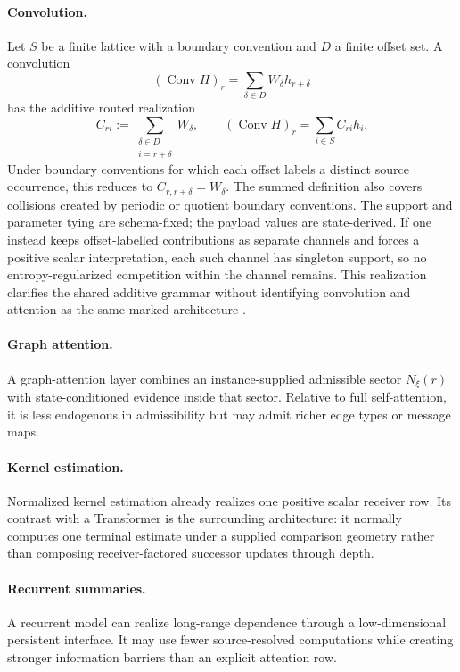 \paragraph{Convolution.}
Let $S$ be a finite lattice with a boundary convention and $D$ a finite offset set. A convolution
\[
(\operatorname{Conv}H)_r=\sum_{\delta\in D}W_\delta h_{r+\delta}
\]
has the additive routed realization
\[
C_{ri}
:=
\sum_{\substack{\delta\in D\\ i=r+\delta}}W_\delta,
\qquad
(\operatorname{Conv}H)_r=\sum_{i\in S}C_{ri}h_i.
\]
Under boundary conventions for which each offset labels a distinct source occurrence, this reduces to $C_{r,r+\delta}=W_\delta$. The summed definition also covers collisions created by periodic or quotient boundary conventions. The support and parameter tying are schema-fixed; the payload values are state-derived. If one instead keeps offset-labelled contributions as separate channels and forces a positive scalar interpretation, each such channel has singleton support, so no entropy-regularized competition within the channel remains. This realization clarifies the shared additive grammar without identifying convolution and attention as the same marked architecture \citep{cordonnier2020relationship}.

\paragraph{Graph attention.}
A graph-attention layer combines an instance-supplied admissible sector $N_\xi(r)$ with state-conditioned evidence inside that sector. Relative to full self-attention, it is less endogenous in admissibility but may admit richer edge types or message maps.

\paragraph{Kernel estimation.}
Normalized kernel estimation already realizes one positive scalar receiver row. Its contrast with a Transformer is the surrounding architecture: it normally computes one terminal estimate under a supplied comparison geometry rather than composing receiver-factored successor updates through depth.

\paragraph{Recurrent summaries.}
A recurrent model can realize long-range dependence through a low-dimensional persistent interface. It may use fewer source-resolved computations while creating stronger information barriers than an explicit attention row.

